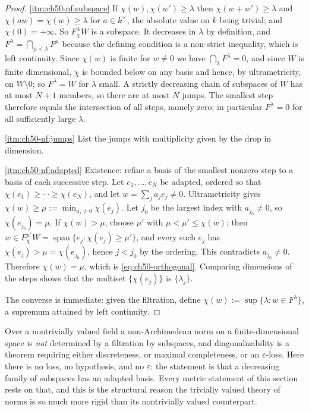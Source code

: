 \begin{proof}
\cref{itm:ch50-nf:subspace}  If $\chi(w),\chi(w')\ge\lambda$ then
$\chi(w+w')\ge\lambda$ and $\chi(aw)=\chi(w)\ge\lambda$ for
$a\in k^\times$, the absolute value on $k$ being trivial; and
$\chi(0)=+\infty$.  So $F^\lambda_\chi W$ is a subspace.  It decreases
in $\lambda$ by definition, and
$F^\lambda=\bigcap_{\mu<\lambda}F^\mu$ because the defining condition is
a non-strict inequality, which is left continuity.  Since $\chi(w)$ is
finite for $w\ne0$ we have $\bigcap_\lambda F^\lambda=0$, and since
$W$ is finite dimensional, $\chi$ is bounded below on any basis and
hence, by ultrametricity, on $W\setminus0$; so $F^\lambda=W$ for
$\lambda$ small.  A strictly decreasing chain of subspaces of $W$ has
at most $N+1$ members, so there are at most $N$ jumps.  The smallest
step therefore equals the intersection of all steps, namely zero;
in particular $F^\lambda=0$ for all sufficiently large $\lambda$.

\cref{itm:ch50-nf:jumps}  List the jumps with multiplicity given by the drop
in dimension.

\cref{itm:ch50-nf:adapted}  Existence: refine a basis of the smallest
nonzero step to a basis of each successive step.  Let $e_1,\dots,e_N$ be
adapted, ordered so that $\chi(e_1)\ge\cdots\ge\chi(e_N)$, and let
$w=\sum_ja_je_j\ne0$.  Ultrametricity gives
$\chi(w)\ge\mu:=\min_{a_j\ne0}\chi(e_j)$.  Let $j_0$ be the largest
index with $a_{j_0}\ne0$, so $\chi(e_{j_0})=\mu$.  If
$\chi(w)>\mu$, choose $\mu'$ with $\mu<\mu'\le\chi(w)$; then
$w\in F^{\mu'}_\chi W=\operatorname{span}\{e_j:\chi(e_j)\ge\mu'\}$, and
every such $e_j$ has $\chi(e_j)>\mu=\chi(e_{j_0})$, hence $j<j_0$ by
the ordering.  This contradicts $a_{j_0}\ne0$.  Therefore
$\chi(w)=\mu$, which is \eqref{eq:ch50-orthogonal}.  Comparing dimensions
of the steps shows that the multiset $\{\chi(e_j)\}$ is
$\{\lambda_j\}$.

The converse is immediate: given the filtration, define
$\chi(w):=\sup\{\lambda:w\in F^\lambda\}$, a supremum attained by left
continuity.
\end{proof}

\begin{remark}
\label{rem:ch50-trivial-special}
Over a nontrivially valued field a non-Archimedean norm on a
finite-dimensional space is \emph{not} determined by a filtration by
subspaces, and diagonalizability is a theorem requiring either
discreteness, or maximal completeness, or an $\varepsilon$-loss.  Here
there is no loss, no hypothesis, and no $\varepsilon$: the statement is
that a decreasing family of subspaces has an adapted basis.  Every metric
statement of this section rests on that, and this is the structural reason
the trivially valued theory of norms is so much more rigid than its
nontrivially valued counterpart.
\end{remark}

